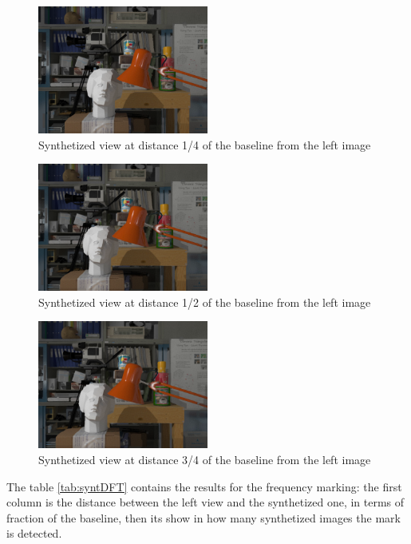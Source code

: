 \begin{figure}[h!]
\centering
\includegraphics[width=0.5\textwidth]{./img/synth_view1_25.png}
\caption{\small{Synthetized view at distance 1/4 of the baseline from the left image }}
\label{fig:synt1/4}
\end{figure}
\begin{figure}[h!]
\centering
\includegraphics[width=0.5\textwidth]{./img/synth_view1_50.png}
\caption{\small{Synthetized view at distance 1/2 of the baseline from the left image }}
\label{fig:synt1/2}
\end{figure}
\begin{figure}[h!]
\centering
\includegraphics[width=0.5\textwidth]{./img/synth_view1_75.png}
\caption{\small{Synthetized view at distance 3/4 of the baseline from the left image }}
\label{fig:synt3/4}
\end{figure}

The table \ref{tab:syntDFT} contains the results for the frequency marking: the first column is the distance between the left view and the synthetized one, in terms of fraction of the baseline, then its show in how many synthetized images the mark is detected.

